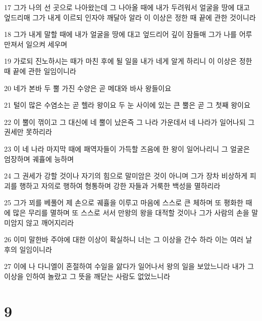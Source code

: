\par 17 그가 나의 선 곳으로 나아왔는데 그 나아올 때에 내가 두려워서 얼굴을 땅에 대고 엎드리매 그가 내게 이르되 인자야 깨달아 알라 이 이상은 정한 때 끝에 관한 것이니라
\par 18 그가 내게 말할 때에 내가 얼굴을 땅에 대고 엎드리어 깊이 잠들매 그가 나를 어루만져서 일으켜 세우며
\par 19 가로되 진노하시는 때가 마친 후에 될 일을 내가 네게 알게 하리니 이 이상은 정한 때 끝에 관한 일임이니라
\par 20 네가 본바 두 뿔 가진 수양은 곧 메대와 바사 왕들이요
\par 21 털이 많은 수염소는 곧 헬라 왕이요 두 눈 사이에 있는 큰 뿔은 곧 그 첫째 왕이요
\par 22 이 뿔이 꺾이고 그 대신에 네 뿔이 났은즉 그 나라 가운데서 네 나라가 일어나되 그 권세만 못하리라
\par 23 이 네 나라 마지막 때에 패역자들이 가득할 즈음에 한 왕이 일어나리니 그 얼굴은 엄장하며 궤휼에 능하며
\par 24 그 권세가 강할 것이나 자기의 힘으로 말미암은 것이 아니며 그가 장차 비상하게 피괴를 행하고 자의로 행하여 형통하며 강한 자들과 거룩한 백성을 멸하리라
\par 25 그가 꾀를 베풀어 제 손으로 궤휼을 이루고 마음에 스스로 큰 체하며 또 평화한 때에 많은 무리를 멸하며 또 스스로 서서 만왕의 왕을 대적할 것이나 그가 사람의 손을 말미암지 않고 깨어지리라
\par 26 이미 말한바 주야에 대한 이상이 확실하니 너는 그 이상을 간수 하라 이는 여러 날 후의 일임이니라
\par 27 이에 나 다니엘이 혼절하여 수일을 앓다가 일어나서 왕의 일을 보았느니라 내가 그 이상을 인하여 놀랐고 그 뜻을 깨닫는 사람도 없었느니라

\chapter{9}

